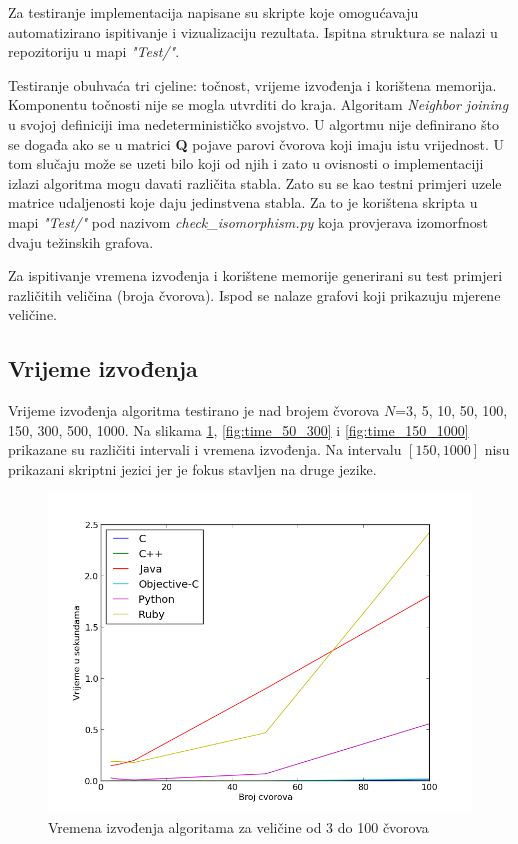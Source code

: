 \documentclass[times, utf8, seminar, numeric]{fer}
\begin{document}
Za testiranje implementacija napisane su skripte koje omogućavaju automatizirano ispitivanje i vizualizaciju rezultata. Ispitna struktura se nalazi u repozitoriju u mapi \emph{"Test/"}.

Testiranje obuhvaća tri cjeline: točnost, vrijeme izvođenja i korištena memorija. Komponentu točnosti nije se mogla utvrditi do kraja. Algoritam \emph{Neighbor joining} u svojoj definiciji ima nedeterminističko svojstvo. U algortmu nije definirano što se događa ako se u matrici \textbf{Q} pojave parovi čvorova koji imaju istu vrijednost. U tom slučaju može se uzeti bilo koji od njih i zato u ovisnosti o implementaciji izlazi algoritma mogu davati različita stabla. Zato su se kao testni primjeri uzele matrice udaljenosti koje daju jedinstvena stabla. Za to je korištena skripta u mapi \emph{"Test/"} pod nazivom \emph{check\_isomorphism.py} koja provjerava izomorfnost dvaju težinskih grafova.

Za ispitivanje vremena izvođenja i korištene memorije generirani su test primjeri različitih veličina (broja čvorova). Ispod se nalaze grafovi koji prikazuju mjerene veličine.

\subsection{Vrijeme izvođenja}

Vrijeme izvođenja algoritma testirano je nad brojem čvorova $N$=3, 5, 10, 50, 100, 150, 300, 500, 1000. Na slikama \ref{fig:time_100}, \ref{fig:time_50_300} i \ref{fig:time_150_1000} prikazane su različiti intervali i vremena izvođenja. Na intervalu $\left [ 150,1000 \right ]$ nisu prikazani skriptni jezici jer je fokus stavljen na druge jezike. 

\begin{figure}[!h]
\centering
\includegraphics[scale=0.6]{./img/Primjeri_do_100.png}
\caption{Vremena izvođenja algoritama za veličine od 3 do 100 čvorova}
\label{fig:time_100}
\end{figure}
\end{document}
